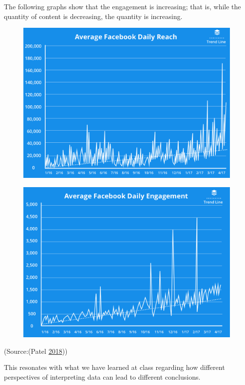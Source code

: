 \documentclass[]{book}
\begin{document}
The following graphs show that the engagement is increasing; that is,
while the quantity of content is decreasing, the quantity is increasing.

\begin{figure}
\centering
\includegraphics{images/average-facebook-reach.png}
\caption{}
\end{figure}

\begin{figure}
\centering
\includegraphics{images/average-facebook-daily-reach.png}
\caption{}
\end{figure}

(Source:(Patel \protect\hyperlink{ref-facebook_organic}{2018}))

This resonates with what we have learned at class regarding how
different perspectives of interpreting data can lead to different
conclusions.
\end{document}
